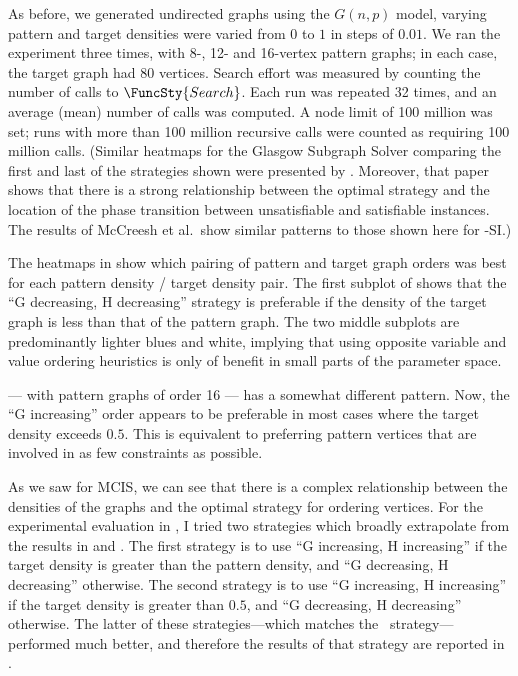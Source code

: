 As before, we generated
undirected graphs using the $G(n,p)$ model, varying pattern and target
densities were varied from $0$ to $1$ in steps of $0.01$.
We ran the experiment three times,
with 8-, 12- and 16-vertex pattern graphs; in each case, the target graph had 80 vertices.
Search effort was measured by counting the number of calls to $\FuncSty{Search}$.
Each run was repeated 32 times, and an average (mean) number of calls was computed.
A node limit of 100 million was set; runs with more than 100 million recursive calls
were counted as requiring 100 million calls.
(Similar heatmaps for the Glasgow Subgraph Solver comparing the first and last of the strategies shown were
presented by \citet{DBLP:journals/jair/McCreeshPST18}.  Moreover,
that paper shows that there is a strong relationship between the optimal strategy
and the location of the phase transition between unsatisfiable and satisfiable
instances.
The results of McCreesh et al.\ show similar patterns to those shown here for \McSplit-SI.)

The heatmaps in  show which pairing of pattern and target
graph orders was best for each pattern density / target density pair.
The first subplot of
shows that the ``G decreasing, H decreasing'' strategy is
preferable if the density of the target graph is less than that of the pattern graph.
The two middle subplots are predominantly lighter blues and white, implying that
using opposite variable and value ordering heuristics is only of benefit in small
parts of the parameter space.

 --- with pattern graphs of order 16 --- has a somewhat different
pattern.  Now, the ``G increasing'' order
appears to be preferable in most cases where the target density exceeds $0.5$.  This is equivalent
to preferring pattern vertices that are involved in as few constraints as possible.

As we saw for MCIS, we can see that there is a complex relationship between
the densities of the graphs and the optimal strategy for ordering vertices.
For the experimental evaluation in , I tried two 
strategies which broadly extrapolate from the results in
 and
.  The first strategy is to use ``G increasing, H increasing''
if the target density is greater than the pattern density, and ``G decreasing, H decreasing''
otherwise.  The second strategy is to use ``G increasing, H increasing'' if the target
density is greater than $0.5$, and ``G decreasing, H decreasing'' otherwise.
The latter of these strategies---which matches the \McSplit\ strategy---performed
much better, and therefore the results of that strategy
are reported in .

